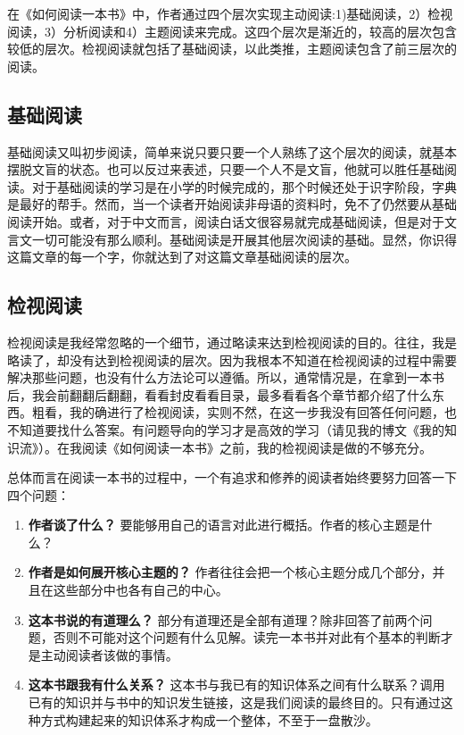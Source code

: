 \documentclass[10pt,a4paper,UTF8]{article}
\begin{document}
在《如何阅读一本书》中，作者通过四个层次实现主动阅读:1)基础阅读，2）检视阅读，3）分析阅读和4）主题阅读来完成。这四个层次是渐近的，较高的层次包含较低的层次。检视阅读就包括了基础阅读，以此类推，主题阅读包含了前三层次的阅读。
\subsection{基础阅读}
\label{sec:orgheadline2}


基础阅读又叫初步阅读，简单来说只要只要一个人熟练了这个层次的阅读，就基本摆脱文盲的状态。也可以反过来表述，只要一个人不是文盲，他就可以胜任基础阅读。对于基础阅读的学习是在小学的时候完成的，那个时候还处于识字阶段，字典是最好的帮手。然而，当一个读者开始阅读非母语的资料时，免不了仍然要从基础阅读开始。或者，对于中文而言，阅读白话文很容易就完成基础阅读，但是对于文言文一切可能没有那么顺利。基础阅读是开展其他层次阅读的基础。显然，你识得这篇文章的每一个字，你就达到了对这篇文章基础阅读的层次。
\subsection{检视阅读}
\label{sec:orgheadline3}


检视阅读是我经常忽略的一个细节，通过略读来达到检视阅读的目的。往往，我是略读了，却没有达到检视阅读的层次。因为我根本不知道在检视阅读的过程中需要解决那些问题，也没有什么方法论可以遵循。所以，通常情况是，在拿到一本书后，我会前翻翻后翻翻，看看封皮看看目录，最多看看各个章节都介绍了什么东西。粗看，我的确进行了检视阅读，实则不然，在这一步我没有回答任何问题，也不知道要找什么答案。有问题导向的学习才是高效的学习（请见我的博文《我的知识流》）。在我阅读《如何阅读一本书》之前，我的检视阅读是做的不够充分。

总体而言在阅读一本书的过程中，一个有追求和修养的阅读者始终要努力回答一下四个问题：
\begin{enumerate}
\item \textbf{作者谈了什么？} 要能够用自己的语言对此进行概括。作者的核心主题是什么？

\item \textbf{作者是如何展开核心主题的？} 作者往往会把一个核心主题分成几个部分，并且在这些部分中也各有自己的中心。

\item \textbf{这本书说的有道理么？} 部分有道理还是全部有道理？除非回答了前两个问题，否则不可能对这个问题有什么见解。读完一本书并对此有个基本的判断才是主动阅读者该做的事情。

\item \textbf{这本书跟我有什么关系？} 这本书与我已有的知识体系之间有什么联系？调用已有的知识并与书中的知识发生链接，这是我们阅读的最终目的。只有通过这种方式构建起来的知识体系才构成一个整体，不至于一盘散沙。
\end{enumerate}
\end{document}

